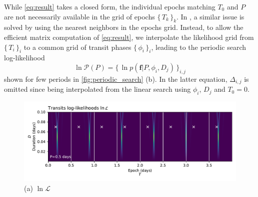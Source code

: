 \documentclass[modern]{aastex631}
\newcommand{\set}[1]{\{\,#1\,\}}
\begin{document}
While \autoref{eq:result} takes a closed form, the individual epochs matching $T_0$ and $P$ are not necessarily available in the grid of epochs $\set{T_k}_k$. In \cite{foreman2016}, a similar issue is solved by using the nearest neighbors in the epochs grid. Instead, to allow the efficient matrix computation of \autoref{eq:result}, we interpolate the likelihood grid from $\set{T_i}_i$ to a common grid of transit phases $\set{\phi_i}_i$, leading to the periodic search log-likelihood
$$\ln\mathcal{P}(P) = \set{\ln p(\bm{f} \vert P, \phi_i, D_j)}_{i,j}$$
shown for few periods in \autoref{fig:periodic_search} (b). In the latter equation, $\Delta_{i,j}$ is omitted since being interpolated from the linear search using $\phi_i$, $D_j$ and $T_0 = 0$.

\begin{figure}[H]
    \centering
    \includegraphics[width=\linewidth]{../workflows/principle/figures/principle_periodic_0.pdf}\\
    {(a) $\ln \mathcal{L}$}
\end{figure}
\end{document}
